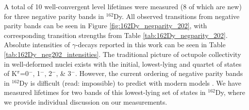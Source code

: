 A total of 10 well-convergent level lifetimes were measured (8 of which are new) for three negative parity bands in $^{162}$Dy. All observed transitions from negative parity bands can be seen in Figure \ref{fig:162Dy_negparity_202}, with corresponding transition strengths from Table \ref{tab:162Dy_negparity_202}. Absolute intensities of $\gamma$-decays reported in this work can be seen in Table \ref{tab:162Dy_neg202_intensities}. The traditional picture of octupole collectivity in well-deformed nuclei exists with the initial, lowest-lying and quartet of states of K$^\pi$=0$^-$, 1$^-$, 2$^-$, \& 3$^-$. However, the current ordering of negative parity bands in $^{162}$Dy is difficult (read: impossible) to predict with modern models \cite{Aprahamian200642}. We have measured lifetimes for two bands of this lowest-lying set of states in $^{162}$Dy, where we provide individual discussion on our measurements.


